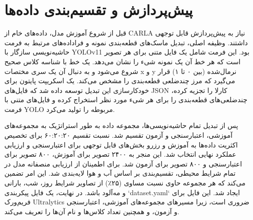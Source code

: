 \documentclass[oneside]{report}
\begin{document}
\chapter{پیش‌پردازش و تقسیم‌بندی داده‌ها}
قبل از شروع آموزش مدل، داده‌های خام از CARLA نیاز به پیش‌پردازش قابل توجهی داشتند. وظیفه اصلی، تبدیل ماسک‌های قطعه‌بندی نمونه و فراداده‌های مرتبط به فرمت حاشیه‌نویسی سازگار با YOLOv11 بود. این فرمت شامل یک فایل متنی برای هر تصویر است که هر خط آن یک نمونه شیء را نشان می‌دهد. یک خط با شناسه کلاس صحیح شروع می‌شود و به دنبال آن یک سری مختصات x و y نرمال‌شده (بین ۰ تا ۱) قرار می‌گیرد که مرز چندضلعی قطعه‌بندی را مشخص می‌کند. یک اسکریپت پایتون برای خودکارسازی این تبدیل توسعه داده شد که فایل‌های JSON کارلا را تجزیه کرده، چندضلعی‌های قطعه‌بندی را برای هر شیء مورد نظر استخراج کرده و فایل‌های متنی با فرمت YOLO مربوطه را تولید می‌کرد.

پس از تبدیل تمام حاشیه‌نویسی‌ها، مجموعه داده به طور استراتژیک به مجموعه‌های آموزشی، اعتبارسنجی و آزمون تقسیم شد. نسبت تقسیم ۶۰:۲۰:۲۰ برای تخصیص اکثریت داده‌ها به آموزش و رزرو بخش‌های قابل توجهی برای اعتبارسنجی و ارزیابی عملکرد نهایی انتخاب شد. این منجر به ۲۴۰۰ تصویر برای آموزش، ۸۰۰ تصویر برای اعتبارسنجی و ۸۰۰ تصویر برای آزمون شد. برای اطمینان از ارزیابی منصفانه مدل در تمام شرایط محیطی، تقسیم‌بندی بر اساس آب و هوا لایه‌بندی شد. این امر تضمین می‌کند که هر مجموعه حاوی نسبت مساوی (۲۵٪) از تصاویر شرایط روز، شب، بارانی و مه‌آلود باشد. در نهایت، یک فایل پیکربندی `dataset.yaml` ایجاد شد. این فایل برای فریم‌ورک Ultralytics ضروری است، زیرا مسیرهای مجموعه‌های آموزشی، اعتبارسنجی و آزمون، و همچنین تعداد کلاس‌ها و نام آن‌ها را تعریف می‌کند.
\end{document}
